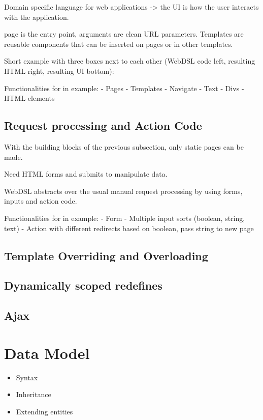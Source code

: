       Domain specific language for web applications -> the UI is how the user interacts with the application.

      page is the entry point, arguments are clean URL parameters. Templates are reusable components that can be inserted on pages or in other templates.

      Short example with three boxes next to each other (WebDSL code left, resulting HTML right, resulting UI bottom):

      Functionalities for in example:
      - Pages
      - Templates
      - Navigate
      - Text
      - Divs
      - HTML elements

    \subsection{Request processing and Action Code}

      With the building blocks of the previous subsection, only static pages can be made.

      Need HTML forms and submits to manipulate data.

      WebDSL abstracts over the usual manual request processing by using forms, inputs and action code.

      Functionalities for in example:
      - Form
      - Multiple input sorts (boolean, string, text)
      - Action with different redirects based on boolean, pass string to new page

    \subsection{Template Overriding and Overloading}

    \subsection{Dynamically scoped redefines}

    \subsection{Ajax}

  \section{Data Model}

    \begin{itemize}
      \item Syntax
      \item Inheritance
      \item Extending entities
    \end{itemize}

